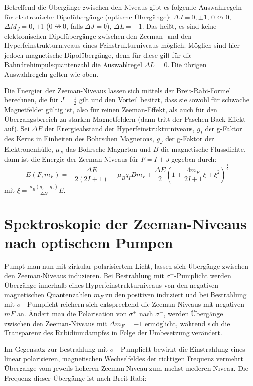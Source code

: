 \documentclass[bigchapter,colorback,accentcolor=tud4b,linedtoc,11pt]{tudreport}
\begin{document}
Betreffend die Übergänge zwischen den Niveaus gibt es folgende Auswahlregeln für elektronische Dipolübergänge (optische Übergänge): $\Delta J = 0, \pm 1,~ 0 \nleftrightarrow 0$, 
$\Delta M_J = 0, \pm 1$ ($ 0\nleftrightarrow 0 $, falls $\Delta J = 0$),
$\Delta L = \pm 1$.
Das heißt, es sind keine elektronischen Dipolübergänge zwischen den Zeeman- und den Hyperfeinstrukturniveaus eines Feinstrukturniveaus möglich. Möglich sind hier jedoch magnetische Dipolübergänge, denn für diese gilt für die Bahndrehimpulsquantenzahl die Auswahlregel $\Delta L = 0$. Die übrigen Auswahlregeln gelten wie oben.

Die Energien der Zeeman-Niveaus lassen sich mittels der Breit-Rabi-Formel berechnen, die für $J = \frac{1}{2}$ gilt und den Vorteil besitzt, dass sie sowohl für schwache Magnetfelder gültig ist, also für reinen Zeeman-Effekt, als auch für den Übergangsbereich zu starken Magnetfeldern (dann tritt der Paschen-Back-Effekt auf). Sei $\Delta E$ der Energieabstand der Hyperfeinstrukturniveaus, $g_I$ der g-Faktor des Kerns in Einheiten des Bohrschen Magnetons, $g_J$ der g-Faktor der Elektronenhülle, $\mu_B$ das Bohrsche Magneton und $B$ die magnetische Flussdichte, dann ist die Energie der Zeeman-Niveaus für $F = I \pm J$ gegeben durch:
$$E(F,m_F) = - \frac{\Delta E}{2 (2I + 1)} + \mu_B g_I B m_F \pm \frac{\Delta E}{2} ( 1 + \frac{4 m_F}{2I+1} \xi + \xi^2 )^{\frac{1}{2}}$$
mit $\xi = \frac{\mu_B (g_J - g_I)}{\Delta E} B.$

\section{Spektroskopie der Zeeman-Niveaus nach optischem Pumpen}

Pumpt man nun mit zirkular polarisiertem Licht, lassen sich Übergänge zwischen den Zeeman-Niveaus induzieren. Bei Bestrahlung mit $\sigma^+$-Pumplicht werden Übergänge innerhalb eines Hyperfeinstrukturniveaus von den negativen magnetischen Quantenzahlen $m_F$ zu den positiven induziert und bei Bestrahlung mit $\sigma^-$-Pumplicht reichern sich entsprechend die Zeeman-Niveaus mit negativen $mF$ an. Ändert man die Polarisation von $\sigma^+$ nach $\sigma^-$, werden Übergänge zwischen den Zeeman-Niveaus mit $\Delta m_F = -1$ ermöglicht, während sich die Transparenz des Rubidiumdampfes in Folge der Umbesetzung verändert.

Im Gegensatz zur Bestrahlung mit $\sigma^-$-Pumplicht bewirkt die Einstrahlung eines linear polarisieren, magnetischen Wechselfeldes der richtigen Frequenz vermehrt Übergänge vom jeweils höheren Zeeman-Niveau zum nächst niederen Niveau. Die Frequenz dieser Übergänge ist nach Breit-Rabi: 
\end{document}
